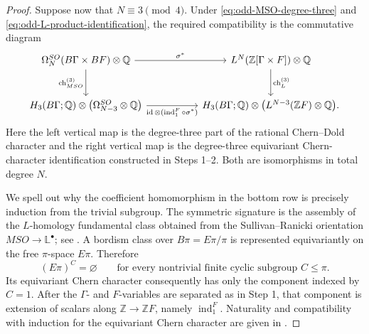 \documentclass[10pt,reqno]{amsart}
\numberwithin{equation}{section}
\theoremstyle{definition}
\theoremstyle{remark}
\newcommand{\Z}{\mathbb Z}
\newcommand{\Q}{\mathbb Q}
\begin{document}
\begin{proof}
Suppose now that \(N\equiv3\pmod4\).  Under
\eqref{eq:odd-MSO-degree-three} and
\eqref{eq:odd-L-product-identification}, the required compatibility is
the commutative diagram
\begin{equation}\label{eq:odd-signature-chern-compatibility}
\begin{tikzcd}[column sep=5.2em,row sep=large]
\Omega_N^{SO}(B\Gamma\times BF)\otimes\Q
  \arrow[r,"\sigma^*"]
  \arrow[d,"\operatorname{ch}^{(3)}_{MSO}"']
& L^N(\Z[\Gamma\times F])\otimes\Q
  \arrow[d,"\operatorname{ch}^{(3)}_{L}"] \\
H_3(B\Gamma;\Q)\otimes
  \bigl(\Omega_{N-3}^{SO}\otimes\Q\bigr)
  \arrow[r,
    "\operatorname{id}\otimes
     (\operatorname{ind}_1^F\circ\sigma^*)"']
& H_3(B\Gamma;\Q)\otimes
  \bigl(L^{N-3}(\Z F)\otimes\Q\bigr).
\end{tikzcd}
\end{equation}
Here the left vertical map is the degree-three part of the rational
Chern--Dold character and the right vertical map is the degree-three
equivariant Chern-character identification constructed in Steps 1--2.
Both are isomorphisms in total degree \(N\).

We spell out why the coefficient homomorphism in the bottom row is
precisely induction from the trivial subgroup.  The symmetric
signature is the assembly of the \(L\)-homology fundamental class
obtained from the Sullivan--Ranicki orientation
\(MSO\to\mathbb L^\bullet\); see
\cite[Propositions~16.15--16.16]{RanickiALT}.  A bordism class over
\(B\pi=E\pi/\pi\) is represented equivariantly on the free
\(\pi\)-space \(E\pi\).  Therefore
\[
(E\pi)^C=\varnothing
\qquad
\text{for every nontrivial finite cyclic subgroup }C\leq\pi.
\]
Its equivariant Chern character consequently has only the component
indexed by \(C=1\).  After the \(\Gamma\)- and \(F\)-variables are
separated as in Step 1, that component is extension of scalars along
\(\Z\to\Z F\), namely \(\operatorname{ind}_1^F\).  Naturality and
compatibility with induction for the equivariant Chern character are
given in \cite[Theorems~0.3 and~6.3]{LueckChern}.


\end{proof}
\end{document}
